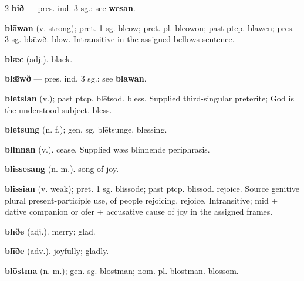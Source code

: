 \begin{multicols*}{2}
\textbf{bið} — pres. ind. 3 sg.: see \textbf{wesan}.\par
\textbf{blāwan} (v. strong); pret. 1 sg. blēow; pret. pl. blēowon; past ptcp. blāwen; pres. 3 sg. blǣwð. blow. Intransitive in the assigned bellows sentence.\par
\textbf{blæc} (adj.). black.\par
\textbf{blǣwð} — pres. ind. 3 sg.: see \textbf{blāwan}.\par
\textbf{blētsian} (v.); past ptcp. blētsod. bless. Supplied third-singular preterite; God is the understood subject. bless.\par
\textbf{blētsung} (n. f.); gen. sg. blētsunge. blessing.\par
\textbf{blinnan} (v.). cease. Supplied wæs blinnende periphrasis.\par
\textbf{blissesang} (n. m.). song of joy.\par
\textbf{blissian} (v. weak); pret. 1 sg. blissode; past ptcp. blissod. rejoice. Source genitive plural present-participle use, of people rejoicing. rejoice. Intransitive; mid + dative companion or ofer + accusative cause of joy in the assigned frames.\par
\textbf{blīðe} (adj.). merry; glad.\par
\textbf{blīðe} (adv.). joyfully; gladly.\par
\textbf{blōstma} (n. m.); gen. sg. blōstman; nom. pl. blōstman. blossom.\par

\end{multicols*}
